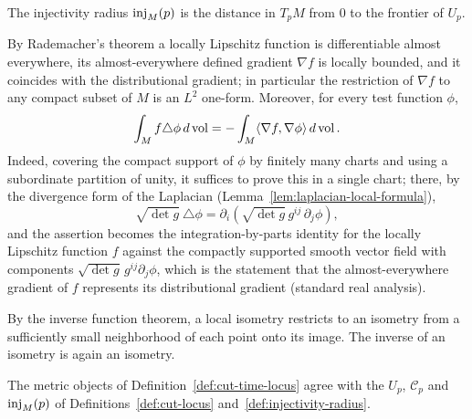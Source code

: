 \begin{remark}
\label{rem:injectivity-radius-frontier}


The injectivity radius $\operatorname{inj}_M(p)$ is the
distance in $T_pM$ from $0$ to the frontier of $U_p$.
\end{remark}

\begin{remark}
\label{rem:laplacian-weak-green-identity}
By Rademacher's theorem a locally Lipschitz function is
differentiable almost everywhere, its almost-everywhere defined
gradient $\nabla f$ is locally bounded, and it coincides with the
distributional gradient; in particular the restriction of $\nabla
f$ to any compact subset of $M$ is an $L^2$ one-form. Moreover, for
every test function $\phi$,
$$\int_Mf\triangle
\phi\, d\operatorname{vol}=-\int_M\langle \nabla f,\nabla\phi\rangle\, d\operatorname{vol}.$$
Indeed, covering the compact support of $\phi$ by finitely many
charts and using a subordinate partition of unity, it suffices to
prove this in a single chart; there, by the divergence form of the
Laplacian (Lemma~\ref{lem:laplacian-local-formula}),
$$\sqrt{\det g}\ \triangle\phi
=\partial_i\left(\sqrt{\det g}\,g^{ij}\,\partial_j\phi\right),$$
and the assertion becomes the integration-by-parts identity for the
locally Lipschitz function $f$ against the compactly supported
smooth vector field with components $\sqrt{\det
g}\,g^{ij}\partial_j\phi$, which is the statement that the
almost-everywhere gradient of $f$ represents its distributional
gradient (standard real analysis).
\end{remark}

\begin{remark}
\label{rem:local-isometry-local-inverse}


By the inverse function theorem, a local isometry restricts to an
isometry from a sufficiently small neighborhood of each point onto
its image.  The inverse of an isometry is again an isometry.
\end{remark}

\begin{remark}
\label{rem:metric-book-cut-locus-agreement}
The metric objects of Definition~\ref{def:cut-time-locus} agree with
the $U_p$, ${\mathcal C}_p$ and $\operatorname{inj}_M(p)$ of
Definitions~\ref{def:cut-locus} and~\ref{def:injectivity-radius}.
\end{remark}

